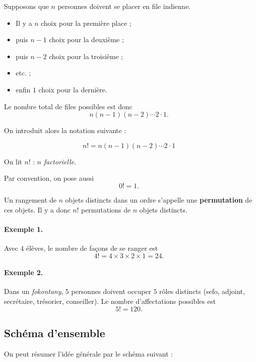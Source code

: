 Supposons que \(n\) personnes doivent se placer en file indienne.

\begin{itemize}
    \item Il y a \(n\) choix pour la première place ;
    \item puis \(n-1\) choix pour la deuxième ;
    \item puis \(n-2\) choix pour la troisième ;
    \item etc. ;
    \item enfin \(1\) choix pour la dernière.
\end{itemize}

Le nombre total de files possibles est donc
\[
n(n-1)(n-2)\cdots 2\cdot 1.
\]

\medskip

On introduit alors la notation suivante :

\[
\boxed{n! = n(n-1)(n-2)\cdots 2\cdot 1}
\]

On lit \(n!\) : \emph{\(n\) factorielle}.

\medskip

Par convention, on pose aussi
\[
\boxed{0! = 1.}
\]

Un rangement de \(n\) objets distincts dans un ordre s’appelle une \textbf{permutation}
de ces objets. Il y a donc \(n!\) permutations de \(n\) objets distincts.

\paragraph{Exemple 1.}
Avec \(4\) élèves, le nombre de façons de se ranger est
\[
4! = 4\times 3\times 2\times 1 = 24.
\]

\paragraph{Exemple 2.}
Dans un \emph{fokontany}, \(5\) personnes doivent occuper \(5\) rôles distincts
(sefo, adjoint, secrétaire, trésorier, conseiller).
Le nombre d’affectations possibles est
\[
5! = 120.
\]

\subsection{Schéma d’ensemble}

On peut résumer l’idée générale par le schéma suivant :

\begin{center}
\end{center}

